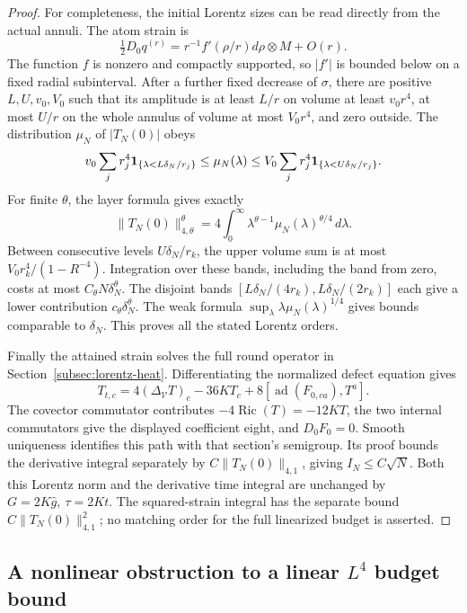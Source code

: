\documentclass[11pt]{article}
\numberwithin{equation}{section}
\theoremstyle{definition}
\theoremstyle{remark}
\begin{document}
\begin{proof}
For completeness, the initial Lorentz sizes can be read
directly from the actual annuli. The atom strain is
\[
 \tfrac12D_0q^{(r)}
   =r^{-1}f'(\rho/r)d\rho\otimes M+O(r).
\]
The function \(f\) is nonzero and compactly supported, so
\(|f'|\) is bounded below on a fixed radial subinterval.
After a further fixed decrease of \(\sigma\), there are
positive \(L,U,v_0,V_0\) such that its amplitude is at least
\(L/r\) on volume at least \(v_0r^4\), at most \(U/r\)
on the whole annulus of volume at most \(V_0r^4\), and zero
outside. The distribution \(\mu_N\) of \(|T_N(0)|\) obeys
\[
 v_0\sum_jr_j^4{\bf1}_{\{\lambda<L\delta_N/r_j\}}
 \le\mu_N(\lambda)\le
 V_0\sum_jr_j^4{\bf1}_{\{\lambda<U\delta_N/r_j\}}.
\]
For finite \(\theta\), the layer formula gives exactly
\[
 \|T_N(0)\|_{4,\theta}^{\theta}
 =4\int_0^\infty\lambda^{\theta-1}
                      \mu_N(\lambda)^{\theta/4}\,d\lambda .
\]
Between consecutive levels \(U\delta_N/r_k\), the upper
volume sum is at most \(V_0r_k^4/(1-R^{-4})\).
Integration over these bands, including the band from zero,
costs at most \(C_\theta N\delta_N^\theta\).
The disjoint bands
\([L\delta_N/(4r_k),L\delta_N/(2r_k)]\) each give a lower
contribution \(c_\theta\delta_N^\theta\).
The weak formula
\(\sup_\lambda\lambda\mu_N(\lambda)^{1/4}\)
gives bounds comparable to \(\delta_N\).
This proves all the stated Lorentz orders.

Finally the attained strain solves the full round operator
in Section~\ref{subsec:lorentz-heat}. Differentiating the
normalized defect equation gives
\[
 T_{t,c}=4(\Delta_{\mathcal V}T)_c-36KT_c
            +8[\operatorname{ad}(F_{0,ca}),T^a].
\]
The covector commutator contributes \(-4\operatorname{Ric}(T)
=-12KT\), the two internal commutators give the displayed
coefficient eight, and \(D_0F_0=0\).
Smooth uniqueness identifies this path with that section's
semigroup. Its proof bounds the derivative integral
separately by \(C\|T_N(0)\|_{4,1}\), giving \(I_N\le C\sqrt N\).
Both this Lorentz norm and the derivative time integral
are unchanged by \(G=2K\widehat g,\ \tau=2Kt\).
The squared-strain integral has the separate bound
\(C\|T_N(0)\|_{4,1}^2\); no matching order for the full
linearized budget is asserted.
\end{proof}



\subsection{A nonlinear obstruction to a linear \texorpdfstring{\(L^4\)}{L4} budget bound}
\label{subsec:nonlinear-linear-budget}
\end{document}
